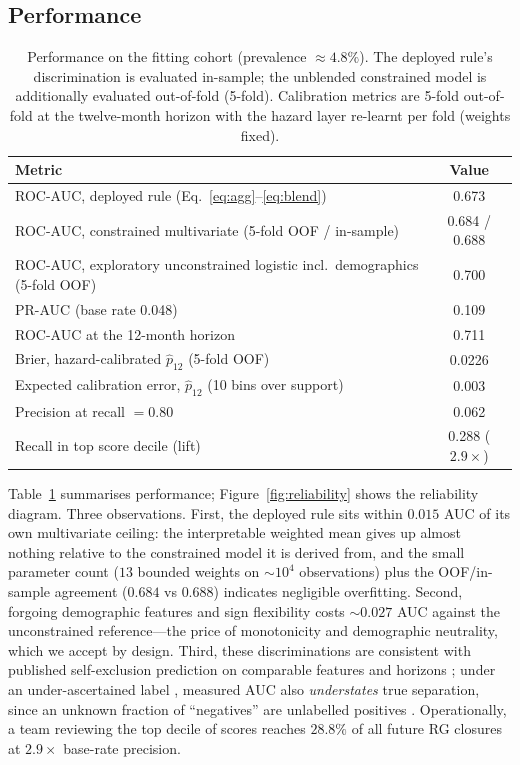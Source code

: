 \documentclass[11pt]{article}
\newcommand{\phat}{\hat{p}}
\begin{document}
\subsection{Performance}\label{sec:performance}

\begin{table}[t]
\centering\small
\caption{Performance on the fitting cohort (prevalence ${\approx}4.8\%$). The
deployed rule's discrimination is evaluated in-sample; the unblended constrained model
is additionally evaluated out-of-fold (5-fold). Calibration metrics are 5-fold
out-of-fold at the twelve-month horizon with the hazard layer re-learnt per fold
(weights fixed).}
\label{tab:perf}
\begin{tabular}{@{}lc@{}}
\toprule
Metric & Value \\
\midrule
ROC-AUC, deployed rule (Eq.~\ref{eq:agg}--\ref{eq:blend}) & 0.673 \\
ROC-AUC, constrained multivariate (5-fold OOF / in-sample) & 0.684 / 0.688 \\
ROC-AUC, exploratory unconstrained logistic incl.\ demographics (5-fold OOF) & 0.700 \\
PR-AUC (base rate 0.048) & 0.109 \\
ROC-AUC at the 12-month horizon & 0.711 \\
Brier, hazard-calibrated $\phat_{12}$ (5-fold OOF) & 0.0226 \\
Expected calibration error, $\phat_{12}$ (10 bins over support) & 0.003 \\
Precision at recall $=0.80$ & 0.062 \\
Recall in top score decile (lift) & 0.288 ($2.9\times$) \\
\bottomrule
\end{tabular}
\end{table}

Table~\ref{tab:perf} summarises performance; Figure~\ref{fig:reliability} shows the
reliability diagram. Three observations. First, the deployed rule sits within
$0.015$ AUC of its own multivariate ceiling: the interpretable weighted mean gives up
almost nothing relative to the constrained model it is derived from, and the small
parameter count ($13$ bounded weights on ${\sim}10^4$ observations) plus the OOF/in-sample
agreement ($0.684$ vs $0.688$) indicates negligible overfitting. Second, forgoing
demographic features and sign flexibility costs ${\sim}0.027$ AUC against the
unconstrained reference---the price of monotonicity and demographic neutrality, which
we accept by design. Third, these discriminations are consistent with published
self-exclusion prediction on comparable features and horizons
\citep{percy2016,finkenwirth2021,hopfgartner2023}; under an under-ascertained label
\citep{catania2021}, measured AUC also \emph{understates} true separation, since an
unknown fraction of ``negatives'' are unlabelled positives \citep{elkan2008}.
Operationally, a team reviewing the top decile of scores reaches $28.8\%$ of all future
RG closures at $2.9\times$ base-rate precision.
\end{document}

